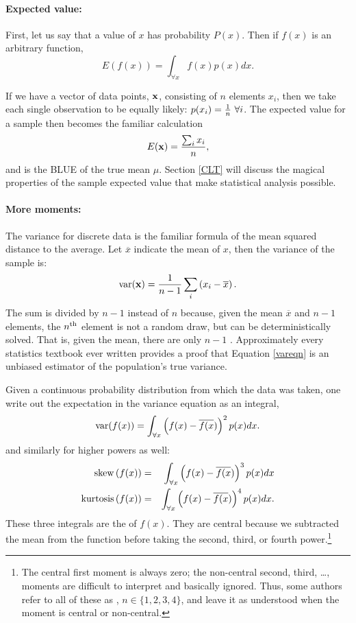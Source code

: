 \paragraph{Expected value:} 
First, let us say that a value of $x$ has probability $P(x)$. Then
if $f(x)$ is an arbitrary function, 
$$E\left(f(x)\right)=\int_{\forall x} f(x)p(x) dx.$$

If we have a vector of data points, ${\bf x}$, consisting of $n$ elements
$x_i$, then we take each single observation to be equally likely:
$p(x_i)={1\over n}\ \forall i$.  The expected value for a sample then
becomes the familiar calculation $$E({\bf x})={\sum_i x_i\over n},$$ and is
the BLUE of the true mean $\mu$. Section
\ref{CLT} will discuss the magical properties of the sample expected
value that make statistical analysis possible.

\paragraph{More moments:}   
The variance for discrete data is the familiar formula of the mean
squared distance to the average. Let $\overline x$ indicate the mean of
$x$, then the variance of the sample is:
\begin{equation}
\operatorname{var}({\bf x}) = {1\over n-1} \sum_i\left(x_i - \overline x\right).
\label{vareqn}
\end{equation}
The sum is divided by $n-1$ instead of $n$ because, given the mean
$\overline x$ and $n-1$ elements, the $n^{\rm th}$ element is not a
random draw, but can be deterministically solved. That is, given the
mean, there are only $n-1$ . Approximately
every statistics textbook ever written provides a proof that Equation
\ref{vareqn} is an unbiased estimator of the population's true variance.

Given a continuous probability distribution from which the data was
taken, one write out the
expectation in the variance equation as an integral,
$$\operatorname{var}(f(x))=\int_{\forall x} \left(f(x) - \overline{f(x})\right)^2 p(x) dx.$$
and similarly for higher powers as well:
\begin{eqnarray*}
{\rm skew}\left(f(x)\right)&=&\int_{\forall x} \left(f(x) - \overline{f(x})\right)^3 p(x) dx\\
{\rm kurtosis}\left(f(x)\right)&=&\int_{\forall x} \left(f(x) - \overline{f(x})\right)^4 p(x) dx.
\end{eqnarray*}
These three integrals are the  of $f(x)$. They
are central because we subtracted the mean from the function before
taking the second, third, or fourth power.\footnote{The
central first moment is always zero; the non-central second, third,
\dots, moments are difficult to interpret and basically ignored. Thus,
some authors refer to all of these as , $n \in
\{1, 2, 3, 4\}$, and leave
it as understood when the moment is central or non-central.}

